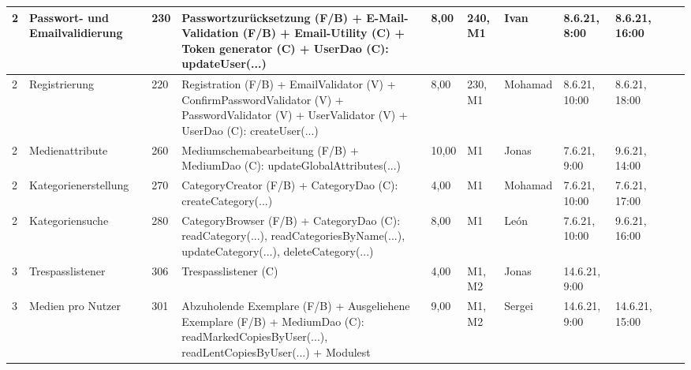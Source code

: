\documentclass{article}
\begin{document}
\begin{table}[H]
\begin{tabular}{l l  l  l l  l  l l  l l  l}
2         & Passwort- und Emailvalidierung      & 230 & Passwortzurücksetzung (F/B) + E-Mail-Validation (F/B) +  Email-Utility (C) + Token generator (C) + UserDao (C): updateUser(...)                                                                                             & 8,00  & 240, M1            & Ivan       & 8.6.21, 8:00   & 8.6.21, 16:00  &                         \\ \hline
2         & Registrierung                       & 220 & Registration (F/B) + EmailValidator (V) + ConfirmPasswordValidator (V) + PasswordValidator (V) + UserValidator (V) + UserDao (C): createUser(...)                                                                             & 8,00  & 230, M1            & Mohamad    & 8.6.21, 10:00  & 8.6.21, 18:00  &                         \\ \hline
2          & Medienattribute                     & 260 & Mediumschemabearbeitung (F/B) + MediumDao (C): updateGlobalAttributes(...)                                                                                                                                        & 10,00 & M1                 & Jonas      & 7.6.21, 9:00   & 9.6.21, 14:00  &                         \\ \hline
2         & Kategorienerstellung                & 270 & CategoryCreator (F/B) + CategoryDao (C): createCategory(...)                                                                                                                                                      & 4,00  & M1                 & Mohamad    & 7.6.21, 10:00  & 7.6.21, 17:00  &                         \\ \hline
2         & Kategoriensuche                     & 280 & CategoryBrowser (F/B) + CategoryDao (C): readCategory(...), readCategoriesByName(...), updateCategory(...), deleteCategory(...)                                                                                   & 8,00  & M1                 & León       & 7.6.21, 10:00  & 9.6.21, 16:00  &                         \\ \hline
3        & Trespasslistener                    & 306 & Trespasslistener (C)                                                                                                                                                                                           & 4,00  & M1, M2             & Jonas      & 14.6.21, 9:00  &                &                         \\ \hline
3        & Medien pro Nutzer                   & 301 & Abzuholende Exemplare (F/B) + Ausgeliehene Exemplare (F/B) + MediumDao (C): readMarkedCopiesByUser(...), readLentCopiesByUser(...) + Modulest  & 9,00  & M1, M2             & Sergei     & 14.6.21, 9:00  & 14.6.21, 15:00 &                         \\ \hline

\end{tabular}
\end{table}
\end{document}
